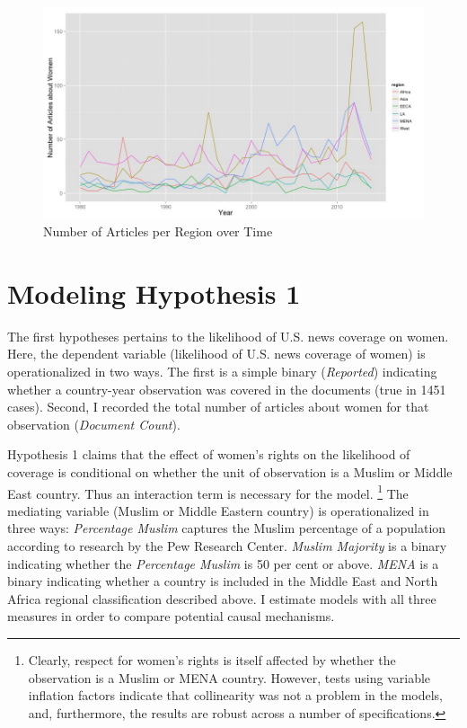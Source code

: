 \documentclass[11pt, oneside]{article}
\begin{document}
\begin{figure}[h]
\caption{Number of Articles per Region over Time}\label{fig:n-region}
\includegraphics[scale=0.55]{n-region-plot}
\end{figure}


\section{Modeling Hypothesis 1}

The first hypotheses pertains to the likelihood of U.S. news coverage on women. Here, the dependent variable (likelihood of U.S. news coverage of women) is operationalized in two ways. The first is a simple binary (\emph{Reported}) indicating whether a country-year observation was covered in the documents (true in 1451 cases). Second, I recorded the total number of articles about women for that observation (\emph{Document Count}). 

Hypothesis 1 claims that the effect of women's rights on the likelihood of coverage is conditional on whether the unit of observation is a Muslim or Middle East country. Thus an interaction term is necessary for the model. \footnote{Clearly, respect for women's rights is itself affected by whether the observation is a Muslim or MENA country. However, tests using variable inflation factors indicate that collinearity was not a problem in the models, and, furthermore, the results are robust across a number of specifications.} The mediating variable (Muslim or Middle Eastern country) is operationalized in three ways: \emph{Percentage Muslim} captures the Muslim percentage of a population according to research by the Pew Research Center. \emph{Muslim Majority} is a binary indicating whether the \emph{Percentage Muslim} is 50 per cent or above. \emph{MENA} is a binary indicating whether a country is included in the Middle East and North Africa regional classification described above. I estimate models with all three measures in order to compare potential causal mechanisms. 
\end{document}
